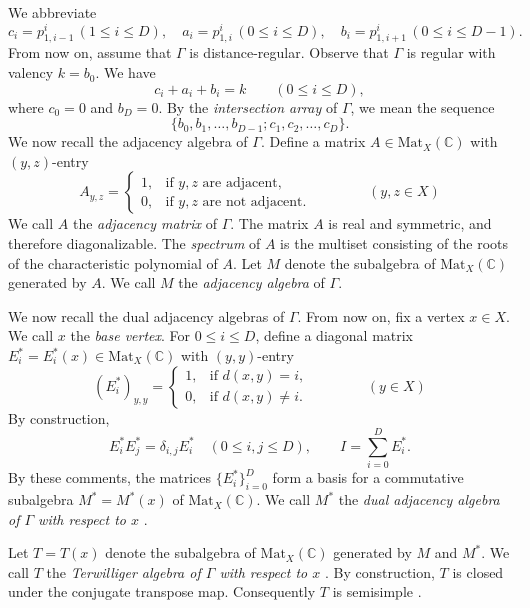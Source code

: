 \documentclass[12pt,letterpaper]{article}
\begin{document}
We abbreviate 
\begin{equation*}
c_i=p_{1,i-1}^i\, (1 \le i \le D), \quad
a_i=p_{1,i}^i\, (0 \le i \le D), \quad
b_i=p_{1,i+1}^i\, (0 \le i \le D-1).
\end{equation*}
From now on, assume that $\Gamma$ is distance-regular. Observe that $\Gamma$ is regular with valency $k=b_0$. We have $$c_i+a_i+b_i=k\quad \quad (0\le i \le D),$$
where $c_0=0$ and $b_D=0$. By the \textit{intersection array} of $\Gamma$, we mean the sequence $$\{b_0,b_1,\dots,b_{D-1};c_1,c_2,\dots,c_D\}.$$
We now recall the adjacency algebra of $\Gamma$. Define a matrix $A \in \mathrm{Mat}_X(\mathbb{C})$ with $(y,z)$-entry
$$A_{y,z} = \begin{cases}
    1, & \text{if $y,z$ are adjacent},\\
    0, & \text{if $y,z$ are not adjacent.}
\end{cases} \quad \quad \quad \quad(y,z \in X)$$
We call $A$ the \emph{adjacency matrix} of $\Gamma$. The matrix $A$ is real and symmetric, and therefore diagonalizable. The \textit{spectrum} of $A$ is the multiset consisting of the roots of the characteristic polynomial of $A$. Let $M$ denote the subalgebra of $\mathrm{Mat}_X(\mathbb{C})$ generated by $A$. We call $M$ the \emph{adjacency algebra} of $\Gamma$.


We now recall the dual adjacency algebras of $\Gamma$. From now on, fix a vertex $x \in X$. We call $x$ the \emph{base vertex}. For $0 \le i \le D$, define a diagonal matrix $E_i^* = E_i^*(x) \in \mathrm{Mat}_X(\mathbb{C})$ with $(y,y)$-entry
$${(E_i^*)}_{y,y} = \begin{cases}
    1, & \text{if $d(x,y)=i$},\\
    0, & \text{if $d(x,y)\ne i$.}
\end{cases} \quad \quad \quad \quad(y \in X)$$
By construction, $$E_i^*E_j^* = \delta_{i,j}E_i^*\quad (0 \le i,j \le D), \quad \quad  I = \sum_{i=0}^D E_i^*.$$
By these comments, the matrices $\{E_i^*\}_{i=0}^D$ form a basis for a commutative subalgebra $M^*=M^*(x)$ of $\mathrm{Mat}_X(\mathbb{C})$. We call $M^*$ the \emph{dual adjacency algebra of $\Gamma$ with respect to $x$} \cite[Sec.\ 2]{terwilliger2022}.

Let $T=T(x)$ denote the subalgebra of $\mathrm{Mat}_X(\mathbb{C})$ generated by $M$ and $M^*$. We call $T$ the \textit{Terwilliger algebra of $\Gamma$ with respect to $x$} \cite[Definition~3.3]{Terwilliger1992}. By construction, $T$ is closed under the conjugate transpose map. Consequently $T$ is semisimple \cite[Sec.\ 1]{Egge2000}. 
\end{document}
